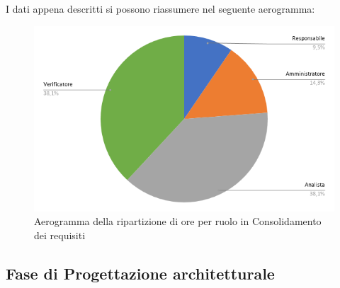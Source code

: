         I dati appena descritti si possono riassumere nel seguente aerogramma:
        \begin{figure}[!h]
            \vspace{5px}
            \includegraphics[scale=0.5]{../../../Images/Diagrammi/Diagramma a torta/ore requisiti.png}
            \centering
            \caption{Aerogramma della ripartizione di ore per ruolo in Consolidamento dei requisiti}
        \end{figure}



\subsection{Fase di Progettazione architetturale}
